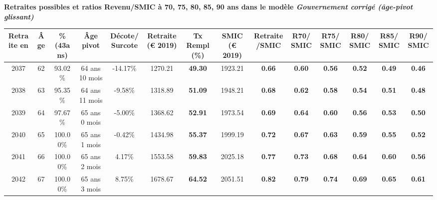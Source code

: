  \vspace{0.1cm} 
{\bf \noindent Retraites possibles et ratios Revenu/SMIC à 70, 75, 80, 85, 90 ans dans le modèle \emph{Gouvernement corrigé (âge-pivot glissant)}}  
 
\begin{adjustbox}{max width=\textwidth} 
\begin{tabular}[htb]{|c|c||c|c|c||c|c||c|c||c|c|c|c|c|} 
\hline 
 Retraite en &  Âge &  \%(43ans) &  Âge pivot &  Décote/Surcote &  Retraite (\euro{} 2019) &  Tx Rempl(\%) &  SMIC (\euro{} 2019) &  Retraite/SMIC &  R70/SMIC &  R75/SMIC &  R80/SMIC &  R85/SMIC &  R90/SMIC \\ 
\hline \hline 
 2037 &  62 &  93.02\% &  64 ans 10 mois &  -14.17\% &  1270.21 &  {\bf 49.30} &  1923.21 &  {\bf {\color{red} 0.66}} &  {\bf {\color{red} 0.60}} &  {\bf {\color{red} 0.56}} &  {\bf {\color{red} 0.52}} &  {\bf {\color{red} 0.49}} &  {\bf {\color{red} 0.46}} \\ 
\hline 
 2038 &  63 &  95.35\% &  64 ans 11 mois &  -9.58\% &  1318.89 &  {\bf 51.09} &  1948.21 &  {\bf {\color{red} 0.68}} &  {\bf {\color{red} 0.62}} &  {\bf {\color{red} 0.58}} &  {\bf {\color{red} 0.54}} &  {\bf {\color{red} 0.51}} &  {\bf {\color{red} 0.48}} \\ 
\hline 
 2039 &  64 &  97.67\% &  65 ans 0 mois &  -5.00\% &  1368.62 &  {\bf 52.91} &  1973.54 &  {\bf {\color{red} 0.69}} &  {\bf {\color{red} 0.64}} &  {\bf {\color{red} 0.60}} &  {\bf {\color{red} 0.56}} &  {\bf {\color{red} 0.53}} &  {\bf {\color{red} 0.50}} \\ 
\hline 
 2040 &  65 &  100.00\% &  65 ans 1 mois &  -0.42\% &  1434.98 &  {\bf 55.37} &  1999.19 &  {\bf {\color{red} 0.72}} &  {\bf {\color{red} 0.67}} &  {\bf {\color{red} 0.63}} &  {\bf {\color{red} 0.59}} &  {\bf {\color{red} 0.55}} &  {\bf {\color{red} 0.52}} \\ 
\hline 
 2041 &  66 &  100.00\% &  65 ans 2 mois &  4.17\% &  1553.58 &  {\bf 59.83} &  2025.18 &  {\bf {\color{red} 0.77}} &  {\bf {\color{red} 0.73}} &  {\bf {\color{red} 0.68}} &  {\bf {\color{red} 0.64}} &  {\bf {\color{red} 0.60}} &  {\bf {\color{red} 0.56}} \\ 
\hline 
 2042 &  67 &  100.00\% &  65 ans 3 mois &  8.75\% &  1678.67 &  {\bf 64.52} &  2051.51 &  {\bf {\color{red} 0.82}} &  {\bf {\color{red} 0.79}} &  {\bf {\color{red} 0.74}} &  {\bf {\color{red} 0.69}} &  {\bf {\color{red} 0.65}} &  {\bf {\color{red} 0.61}} \\ 
\hline 
\hline 
\end{tabular} 
\end{adjustbox} 
 
